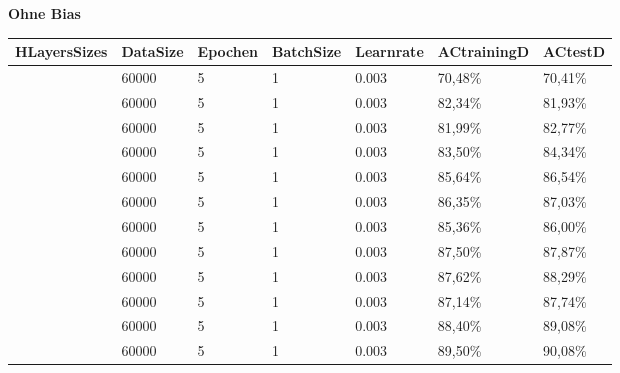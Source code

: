 \documentclass[12pt]{article}
\begin{document}
\begin{table}[H]
    \centering
    \textbf{Ohne Bias}
    \begin{tabular}{|l|l|l|l|l|l|l|}
    \hline
        HLayersSizes & DataSize & Epochen & BatchSize & Learnrate & ACtrainingD & ACtestD \\ \hline
        [784, 10, 10] & 60000 & 5 & 1 & 0.003 & 70,48\% & 70,41\% \\ \hline
        [784, 20, 10] & 60000 & 5 & 1 & 0.003 & 82,34\% & 81,93\% \\ \hline
        [784, 30, 10] & 60000 & 5 & 1 & 0.003 & 81,99\% & 82,77\% \\ \hline
        [784, 40, 10] & 60000 & 5 & 1 & 0.003 & 83,50\% & 84,34\% \\ \hline
        [784, 50, 10] & 60000 & 5 & 1 & 0.003 & 85,64\% & 86,54\% \\ \hline
        [784, 60, 10] & 60000 & 5 & 1 & 0.003 & 86,35\% & 87,03\% \\ \hline
        [784, 70, 10] & 60000 & 5 & 1 & 0.003 & 85,36\% & 86,00\% \\ \hline
        [784, 80, 10] & 60000 & 5 & 1 & 0.003 & 87,50\% & 87,87\% \\ \hline
        [784, 90, 10] & 60000 & 5 & 1 & 0.003 & 87,62\% & 88,29\% \\ \hline
        [784, 100, 10] & 60000 & 5 & 1 & 0.003 & 87,14\% & 87,74\% \\ \hline
        [784, 150, 10] & 60000 & 5 & 1 & 0.003 & 88,40\% & 89,08\% \\ \hline
        [784, 200, 10] & 60000 & 5 & 1 & 0.003 & 89,50\% & 90,08\% \\ \hline
    \end{tabular}
\end{table}
\end{document}
